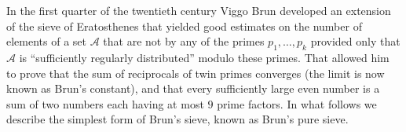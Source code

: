 \documentclass[12pt]{article}
\begin{document}

In the first quarter of the twentieth century Viggo Brun developed
an extension of the sieve of Eratosthenes that yielded good
estimates on the number of elements of a set $\mathcal{A}$ that
are not  by any of the primes $p_1,\dotsc,p_k$ provided
only that $\mathcal{A}$ is ``sufficiently regularly distributed''
modulo these primes. That allowed him to prove that the sum of
reciprocals of twin primes converges (the limit is now known as
Brun's constant), and that every sufficiently large even number is
a sum of two numbers each having at most $9$ prime factors. In
what follows we describe the simplest form of Brun's sieve, known
as Brun's pure sieve.
\end{document}

